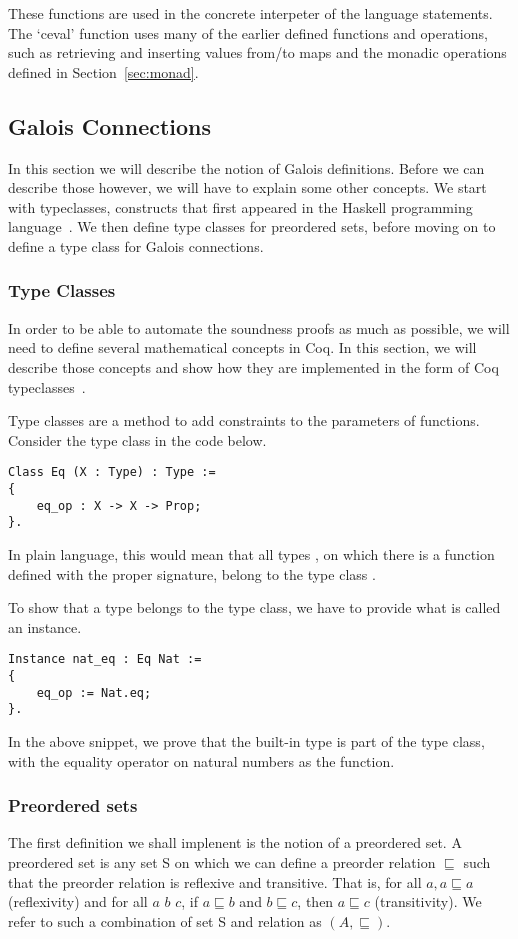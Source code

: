 These functions are used in the concrete interpeter of the language statements.
The `ceval' function uses many of the earlier defined functions and operations,
such as retrieving and inserting values from/to maps and the monadic operations
defined in Section~\ref{sec:monad}.

\subsection{Galois Connections}
In this section we will describe the notion of Galois definitions. Before we
can describe those however, we will have to explain some other concepts. We
start with typeclasses, constructs that first appeared in the Haskell
programming language~\cite{wadler1989make}. We then define type classes for
preordered sets, before moving on to define a type class for Galois
connections.

\subsubsection{Type Classes}
In order to be able to automate the soundness proofs as much as possible, we
will need to define several mathematical concepts in Coq. In this section, we
will describe those concepts and show how they are implemented in the form of
Coq typeclasses~\cite{sozeau2008first}. 

Type classes are a method to add constraints to the parameters of functions.
Consider the type class  in the code below.

\begin{verbatim}
Class Eq (X : Type) : Type :=
{
	eq_op : X -> X -> Prop;
}.
\end{verbatim}

In plain language, this would mean that all types , on which there is a
function  defined with the proper signature, belong to the type
class . 

To show that a type belongs to the type class, we have to provide what is
called an instance.

\begin{verbatim}
Instance nat_eq : Eq Nat :=
{
	eq_op := Nat.eq;
}.
\end{verbatim}

In the above snippet, we prove that the built-in  type is part of
the  type class, with the equality operator on natural numbers as the
 function.

\subsubsection{Preordered sets}
The first definition we shall implenent is the notion of a preordered set. 
A preordered set is any set S on which we can define a preorder relation
$\sqsubseteq$ such that the preorder relation is reflexive and transitive. That
is, for all $a, a \sqsubseteq a$ (reflexivity) and for all $a$ $b$ $c$, if $a
\sqsubseteq b$ and $b \sqsubseteq c$, then $a \sqsubseteq c$ (transitivity).
We refer to such a combination of set S and relation as $(A, \sqsubseteq)$.

